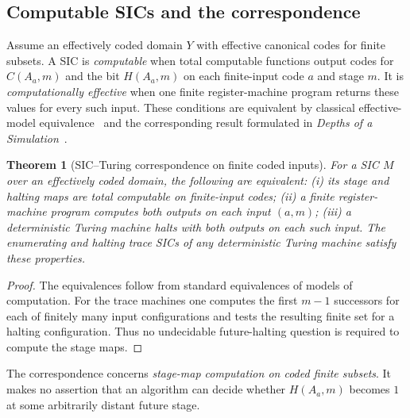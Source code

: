 \documentclass[11pt,letterpaper]{article}
\newtheorem{theorem}{Theorem}[section]\newtheorem{proposition}[theorem]{Proposition}\newtheorem{lemma}[theorem]{Lemma}\newtheorem{corollary}[theorem]{Corollary}\newtheorem{conjecture}[theorem]{Conjecture}\theoremstyle{definition}\newtheorem{definition}[theorem]{Definition}\newtheorem{example}[theorem]{Example}\newtheorem{remark}[theorem]{Remark}
\begin{document}
\subsection{Computable SICs and the correspondence}
Assume an effectively coded domain $Y$ with effective canonical codes for finite subsets. A SIC is \emph{computable} when total computable functions output codes for $C(A_a,m)$ and the bit $H(A_a,m)$ on each finite-input code $a$ and stage $m$. It is \emph{computationally effective} when one finite register-machine program returns these values for every such input. These conditions are equivalent by classical effective-model equivalence~\cite{rogers} and the corresponding result formulated in \emph{Depths of a Simulation}~\cite{depths}.

\begin{theorem}[SIC--Turing correspondence on finite coded inputs]
For a SIC $M$ over an effectively coded domain, the following are equivalent: (i) its stage and halting maps are total computable on finite-input codes; (ii) a finite register-machine program computes both outputs on each input $(a,m)$; (iii) a deterministic Turing machine halts with both outputs on each such input. The enumerating and halting trace SICs of any deterministic Turing machine satisfy these properties.
\end{theorem}
\begin{proof}
The equivalences follow from standard equivalences of models of computation. For the trace machines one computes the first $m-1$ successors for each of finitely many input configurations and tests the resulting finite set for a halting configuration. Thus no undecidable future-halting question is required to compute the stage maps.
\end{proof}
The correspondence concerns \emph{stage-map computation on coded finite subsets}. It makes no assertion that an algorithm can decide whether $H(A_a,m)$ becomes $1$ at some arbitrarily distant future stage.
\end{document}
